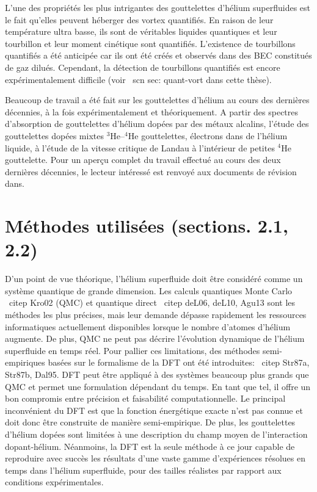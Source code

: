 		L'une des propriétés les plus intrigantes des gouttelettes d'hélium superfluides est le fait qu'elles peuvent héberger des vortex quantifiés. En raison de leur température ultra basse, ils sont de véritables liquides quantiques et leur tourbillon et leur moment cinétique sont quantifiés. L'existence de tourbillons quantifiés a été anticipée car ils ont été créés et observés dans des BEC constitués de gaz dilués. Cependant, la détection de tourbillons quantifiés est encore expérimentalement difficile (voir \ scn {sec: quant-vort} dans cette thèse).

		Beaucoup de travail a été fait sur les gouttelettes d'hélium au cours des dernières décennies, à la fois expérimentalement et théoriquement. A partir des spectres d'absorption de gouttelettes d'hélium dopées par des métaux alcalins, l'étude des gouttelettes dopées mixtes $^3$He--$^4$He gouttelettes, électrons dans de l'hélium liquide, à l'étude de la vitesse critique de Landau à l'intérieur de petites $^4$He gouttelette. Pour un aperçu complet du travail effectué au cours des deux dernières décennies, le lecteur intéressé est renvoyé aux documents de révision dans.
	
	\section*{Méthodes utilisées (sections. 2.1, 2.2)}
		D'un point de vue théorique, l'hélium superfluide doit être considéré comme un système quantique de grande dimension. Les calculs quantiques Monte Carlo \ citep {Kro02} (QMC) et quantique direct \ citep {deL06, deL10, Agu13} sont les méthodes les plus précises, mais leur demande dépasse rapidement les ressources informatiques actuellement disponibles lorsque le nombre d'atomes d'hélium augmente. De plus, QMC ne peut pas décrire l'évolution dynamique de l'hélium superfluide en temps réel. Pour pallier ces limitations, des méthodes semi-empiriques basées sur le formalisme de la DFT ont été introduites: \ citep {Str87a, Str87b, Dal95}. DFT peut être appliqué à des systèmes beaucoup plus grands que QMC et permet une formulation dépendant du temps. En tant que tel, il offre un bon compromis entre précision et faisabilité computationnelle. Le principal inconvénient du DFT est que la fonction énergétique exacte n'est pas connue et doit donc être construite de manière semi-empirique. De plus, les gouttelettes d'hélium dopées sont limitées à une description du champ moyen de l'interaction dopant-hélium. Néanmoins, la DFT est la seule méthode à ce jour capable de reproduire avec succès les résultats d'une vaste gamme d'expériences résolues en temps dans l'hélium superfluide, pour des tailles réalistes par rapport aux conditions expérimentales.

